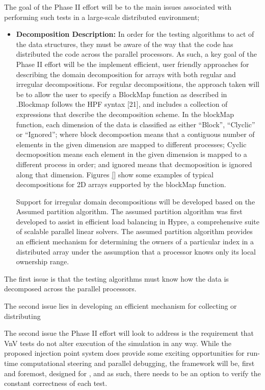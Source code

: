 The goal of the Phase II effort will be to the main issues associated with performing such tests in a large-scale distributed environment;
\begin{itemize}
 \item {\bf Decomposition Description:} In order for the testing algorithms to act of the data structures, they must be aware of the way that the code has distributed 
 the code across the parallel processors. As such, a key goal of the Phase II effort will be the implement efficient, user friendly approaches for describing the domain 
 decomposition for arrays with both regular and irregular decompositions. For regular decompositions, the approach taken will be to allow the user to specify a BlockMap function as described in \cite{}.Blockmap follows the HPF syntax [21], and includes a collection of expressions that describe the decomposition scheme. In the blockMap function, each dimension of the data is classified as either ``Block'', ``Clyclic'' or ``Ignored''; where block decompostion means that a contiguous number of elements in the given dimension are mapped to different processes; Cyclic decmoposition means each element in the given dimension is mapped to a different process in order; and ignored means that decmoposition is ignored along that dimension. Figures \ref{} show some examples of typical decompositions for 2D arrays supported by the blockMap function.
 
 Support for irregular domain decompositions will be developed based on the Assumed partition algorithm. The assumed partition algorithm was first developed to assist in efficient load balancing in Hypre, a comprehensive suite of scalable parallel linear solvers. The assumed partition algorithm provides an efficient mechanism for determining the owners of a particular index in a distributed array under the assumption that a processor knows only its local ownership range. 
 
 
 
 
\end{itemize}


The first issue is that the testing algorithms must know how the data is decomposed across the parallel processors.



The second issue lies in developing an efficient mechanism for collecting or distributing 






The second issue the Phase II effort will look to address is the requirement that VnV tests do not alter execution of the simulation in any way. While the proposed injection point system does provide some exciting opportunities for run-time computational steering and parallel debugging, the framework will be, first and foremost, designed for \VV, and as such, there needs to be an option to verify the constant correctness of each test.





